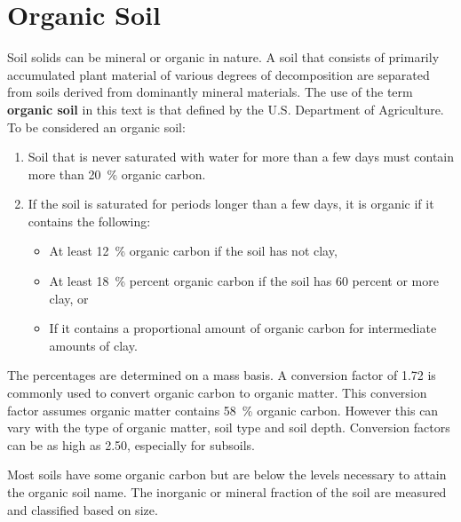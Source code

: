 \documentclass{article}
\begin{document}


\section{Organic Soil}
\label{organic_soil}
    
Soil solids can be mineral or organic in nature. A soil that consists of primarily accumulated plant material of various degrees of decomposition are separated from soils derived from dominantly mineral materials. The use of the term \textbf{organic soil} in this text is that defined by the U.S. Department of Agriculture. To be considered an organic soil:
    
\begin{enumerate}
    \item Soil that is never saturated with water for more than a few days must contain more than \qty{20}{\percent} organic carbon.
    \item If the soil is saturated for periods longer than a few days, it is organic if it contains the following:
    \begin{itemize}
        \item At least \qty{12}{\percent} organic carbon if the soil has not clay,
        \item At least \qty{18}{\percent} percent organic carbon if the soil has 60 percent or more clay, or
        \item If it contains a proportional amount of organic carbon for intermediate amounts of clay.
    \end{itemize}
\end{enumerate}
    
The percentages are determined on a mass basis. A conversion factor of \num{1.72} is commonly used to convert organic carbon to organic matter. This conversion factor assumes organic matter contains \qty{58}{\percent} organic carbon. However this can vary with the type of organic matter, soil type and soil depth. Conversion factors can be as high as \num{2.50}, especially for subsoils.
    
Most soils have some organic carbon but are below the levels necessary to attain the organic soil name. The inorganic or mineral fraction of the soil are measured and classified based on size.
    
\end{document}
